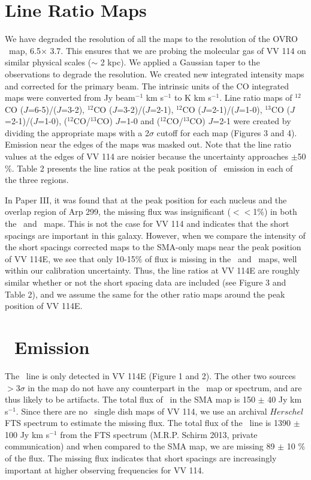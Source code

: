 \section{Line Ratio Maps} %
We have degraded the resolution of all the maps to the resolution of the OVRO \coone\ map, 6.5\arcsec $\times$ 3.7\arcsec. This ensures that we are probing the molecular gas of VV 114 on similar physical scales ($\sim$ 2 kpc). We applied a Gaussian taper to the observations to degrade the resolution. We created new integrated intensity maps and corrected for the primary beam. The intrinsic units of the CO integrated maps were converted from Jy beam$^{-1}$ km s$^{-1}$ to K km s$^{-1}$. Line ratio maps of $^{12}$CO ($J$=6-5)/($J$=3-2), $^{12}$CO ($J$=3-2)/($J$=2-1), $^{12}$CO ($J$=2-1)/($J$=1-0), $^{13}$CO ($J$=2-1)/($J$=1-0), ($^{12}$CO/$^{13}$CO) $J$=1-0 and ($^{12}$CO/$^{13}$CO) $J$=2-1 were created by dividing the appropriate maps with a 2$\sigma$ cutoff for each map (Figures 3 and 4). Emission near the edges of the maps was masked out. Note that the line ratio values at the edges of VV 114 are noisier because the uncertainty approaches $\pm$50$\%$. Table 2 presents the line ratios at the peak position of \cothree\ emission in each of the three regions. 

In Paper III, it was found that at the peak position for each nucleus and the overlap region of Arp 299, the missing flux was insignificant ($<<$1$\%$) in both the \cotwo\ and \cothree\ maps. This is not the case for VV 114 and indicates that the short spacings are important in this galaxy. However, when we compare the intensity of the short spacings corrected maps to the SMA-only maps near the peak position of VV 114E, we see that only 10-15$\%$ of flux is missing in the \cothree\ and \cotwo\ maps, well within our calibration uncertainty. Thus, the line ratios at VV 114E are roughly similar whether or not the short spacing data are included (see Figure 3 and Table 2), and we assume the same for the other ratio maps around the peak position of VV 114E. 

\section{\cosix\ Emission}%
The \cosix\ line is only detected in VV 114E (Figure 1 and 2). The other two sources $>$3$\sigma$ in the map do not have any counterpart in the \cothree\ map or spectrum, and are thus likely to be artifacts. The total flux of \cosix\ in the SMA map is 150 $\pm$ 40 Jy km s$^{-1}$. Since there are no \cosix\ single dish maps of VV 114, we use an archival $Herschel$ FTS spectrum to estimate the missing flux. The total flux of the \cosix\ line is 1390 $\pm$ 100 Jy km s$^{-1}$ from the FTS spectrum (M.R.P. Schirm 2013, private communication) and when compared to the SMA map, we are missing 89 $\pm$ 10 $\%$ of the flux. The missing flux indicates that short spacings are increasingly important at higher observing frequencies for VV 114. 


